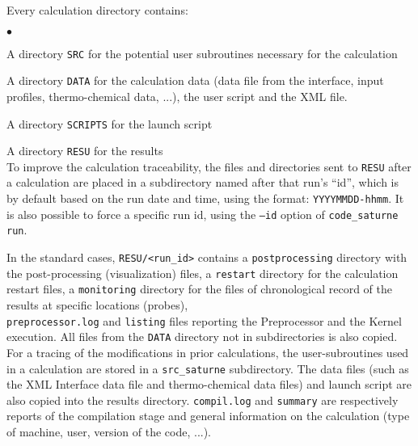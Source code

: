 \noindent
Every calculation directory contains:
\begin{list}{$\bullet$}{}
\item A directory \texttt{SRC} for the potential user subroutines
      necessary for the calculation
\item A directory \texttt{DATA} for the calculation data (data
      file from the interface, input profiles, thermo-chemical data, ...), the user script and the XML file.
\item A directory \texttt{SCRIPTS} for the launch script
\item A directory \texttt{RESU} for the results\\
To improve the calculation traceability, the files and directories
sent to \texttt{RESU} after a calculation are  placed in a subdirectory
named after that run's ``id'', which is by default based on the run date
and time, using the format: \texttt{YYYYMMDD-hhmm}.
It is also possible to force a specific run id, using the \texttt{--id}
option of \texttt{code\_saturne run}.
\end{list}

\noindent
In the standard cases, \texttt{RESU/<run\_id>} contains a
\texttt{postprocessing} directory with the post-processing
(visualization) files, a \texttt{restart} directory for the calculation
restart files, a \texttt{monitoring} directory for the files of chronological
record of the results at specific locations (probes),\\
\texttt{preprocessor.log} and \texttt{listing} files reporting the
Preprocessor and the Kernel execution. All files from the \texttt{DATA}
directory not in subdirectories is also copied. For a tracing of
the modifications in prior calculations, the user-subroutines used in
a calculation are stored in a \texttt{src\_saturne} subdirectory. The data files
(such as the XML Interface data file and thermo-chemical data files) and
launch script are also copied into the results directory. \texttt{compil.log} and
\texttt{summary} are respectively reports of the compilation stage and
general information on the calculation (type of machine, user,
version of the code, ...).

